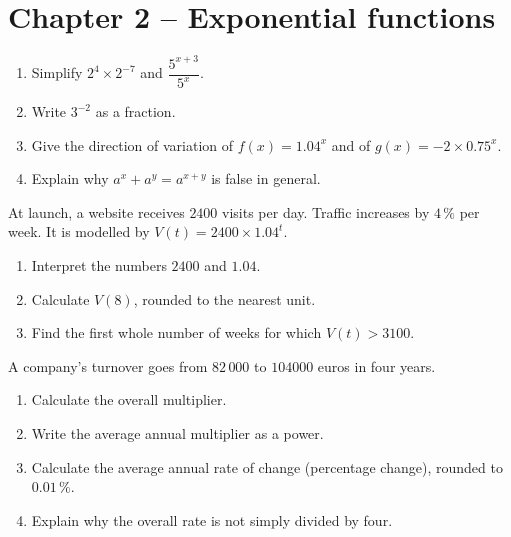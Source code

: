 
\section*{Chapter 2 -- Exponential functions}
\begin{exercice}
\begin{enumerate}
\item Simplify $2^4\times2^{-7}$ and $\dfrac{5^{x+3}}{5^x}$.
\item Write $3^{-2}$ as a fraction.
\item Give the direction of variation of $f(x)=1.04^x$ and of $g(x)=-2\times0.75^x$.
\item Explain why $a^x+a^y=a^{x+y}$ is false in general.
\end{enumerate}
\end{exercice}
\begin{exercice}
At launch, a website receives $2400$ visits per day. Traffic increases by $4\,\%$ per week. It is modelled by $V(t)=2400\times1.04^t$.
\begin{enumerate}
\item Interpret the numbers $2400$ and $1.04$.
\item Calculate $V(8)$, rounded to the nearest unit.
\item Find the first whole number of weeks for which $V(t)>3100$.
\end{enumerate}
\end{exercice}
\begin{exercice}
A company's turnover goes from $82\,000$ to $104000$ euros in four years.
\begin{enumerate}
\item Calculate the overall multiplier.
\item Write the average annual multiplier as a power.
\item Calculate the average annual rate of change (percentage change), rounded to $0.01\,\%$.
\item Explain why the overall rate is not simply divided by four.
\end{enumerate}
\end{exercice}
